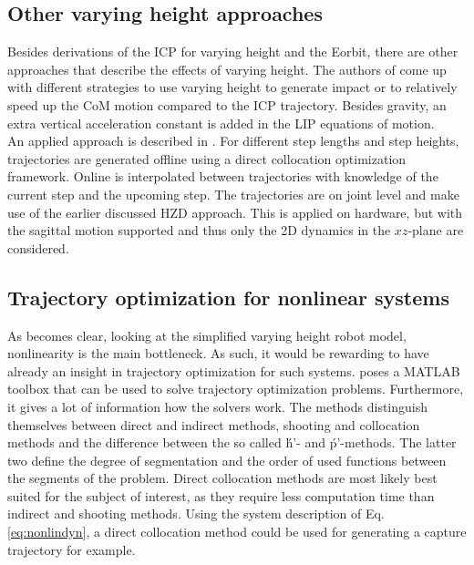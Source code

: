 \subsection{Other varying height approaches}
Besides derivations of the \ac{ICP} for varying height and the \ac{Eorbit}, there are other approaches that describe the effects of varying height. The authors of \cite{gao2017increase} come up with different strategies to use varying height to generate impact or to relatively speed up the \ac{CoM} motion compared to the \ac{ICP} trajectory. Besides gravity, an extra vertical acceleration constant is added in the \ac{LIP} equations of motion. \\
An applied approach is described in \cite{nguyen2017dynamic}. For different step lengths and step heights, trajectories are generated offline using a direct collocation optimization framework. Online is interpolated between trajectories with knowledge of the current step and the upcoming step. The trajectories are on joint level and make use of the earlier discussed \ac{HZD} approach. This is applied on hardware, but with the sagittal motion supported and thus only the \ac{2D} dynamics in the $xz$-plane are considered.

\subsection{Trajectory optimization for nonlinear systems}
As becomes clear, looking at the simplified varying height robot model, nonlinearity is the main bottleneck. As such, it would be rewarding to have already an insight in trajectory optimization for such systems. \cite{kelly2017introduction} poses a MATLAB  toolbox that can be used to solve trajectory optimization problems. Furthermore, it gives a lot of information how the solvers work. The methods distinguish themselves between direct and indirect methods, shooting and collocation methods and the difference between the so called \'h'- and \'p'-methods. The latter two define the degree of segmentation and the order of used functions between the segments of the problem. Direct collocation methods are most likely best suited for the subject of interest, as they require less computation time than indirect and shooting methods. Using the system description of Eq. \eqref{eq:nonlindyn}, a direct collocation method could be used for generating a capture trajectory for example. 




